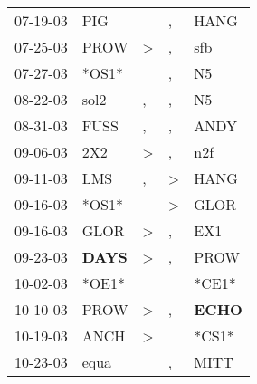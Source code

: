 \begin{supertabular}{p{0.07\textwidth}p{0.06\textwidth}p{0.02\textwidth}p{0.02\textwidth}p{0.06\textwidth}}
          07-19-03\textsuperscript{} &            PIG\textsuperscript{} &                  &                , &           HANG\textsuperscript{} \\
          07-25-03\textsuperscript{} &           PROW\textsuperscript{} &     \textgreater &                , &            sfb\textsuperscript{} \\
          07-27-03\textsuperscript{} &                            *OS1* &                  &                , &             N5\textsuperscript{} \\
          08-22-03\textsuperscript{} &           sol2\textsuperscript{} &                , &                , &             N5\textsuperscript{} \\
          08-31-03\textsuperscript{} &           FUSS\textsuperscript{} &                , &                , &           ANDY\textsuperscript{} \\
          09-06-03\textsuperscript{} &            2X2\textsuperscript{} &     \textgreater &                , &            n2f\textsuperscript{} \\
          09-11-03\textsuperscript{} &            LMS\textsuperscript{} &                , &     \textgreater &           HANG\textsuperscript{} \\
          09-16-03\textsuperscript{} &                            *OS1* &                  &     \textgreater &           GLOR\textsuperscript{} \\
          09-16-03\textsuperscript{} &           GLOR\textsuperscript{} &     \textgreater &                , &            EX1\textsuperscript{} \\
          09-23-03\textsuperscript{} &  \textbf{DAYS\textsuperscript{}} &     \textgreater &                , &           PROW\textsuperscript{} \\
          10-02-03\textsuperscript{} &                            *OE1* &                  &                  &                            *CE1* \\
          10-10-03\textsuperscript{} &           PROW\textsuperscript{} &     \textgreater &                , &  \textbf{ECHO\textsuperscript{}} \\
          10-19-03\textsuperscript{} &           ANCH\textsuperscript{} &     \textgreater &                  &                            *CS1* \\
          10-23-03\textsuperscript{} &           equa\textsuperscript{} &                  &                , &           MITT\textsuperscript{} \\

\end{supertabular}
